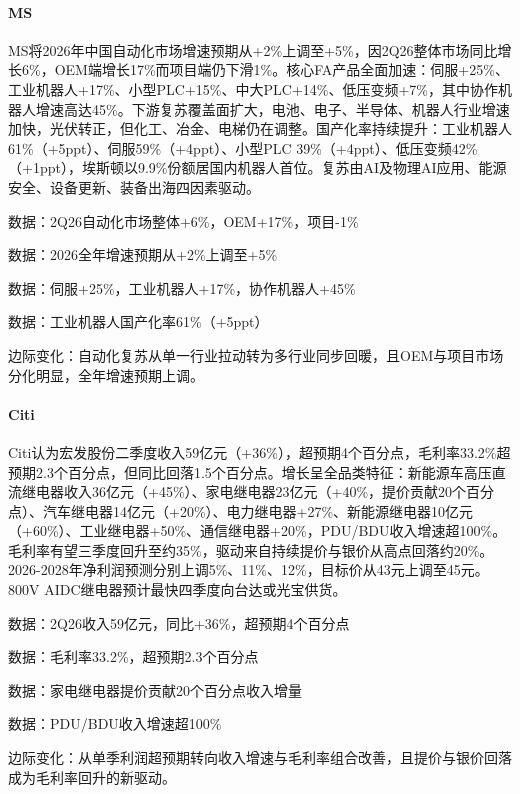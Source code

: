 \documentclass[11pt]{ctexart}
\begin{document}
\paragraph{MS} MS将2026年中国自动化市场增速预期从+2\%上调至+5\%，因2Q26整体市场同比增长6\%，OEM端增长17\%而项目端仍下滑1\%。核心FA产品全面加速：伺服+25\%、工业机器人+17\%、小型PLC+15\%、中大PLC+14\%、低压变频+7\%，其中协作机器人增速高达45\%。下游复苏覆盖面扩大，电池、电子、半导体、机器人行业增速加快，光伏转正，但化工、冶金、电梯仍在调整。国产化率持续提升：工业机器人61\%（+5ppt）、伺服59\%（+4ppt）、小型PLC 39\%（+4ppt）、低压变频42\%（+1ppt），埃斯顿以9.9\%份额居国内机器人首位。复苏由AI及物理AI应用、能源安全、设备更新、装备出海四因素驱动。
{\small\color{refgray}数据：2Q26自动化市场整体+6\%，OEM+17\%，项目-1\%\par}
{\small\color{refgray}数据：2026全年增速预期从+2\%上调至+5\%\par}
{\small\color{refgray}数据：伺服+25\%，工业机器人+17\%，协作机器人+45\%\par}
{\small\color{refgray}数据：工业机器人国产化率61\%（+5ppt）\par}
{\small\color{refgray}边际变化：自动化复苏从单一行业拉动转为多行业同步回暖，且OEM与项目市场分化明显，全年增速预期上调。\par}
\paragraph{Citi} Citi认为宏发股份二季度收入59亿元（+36\%），超预期4个百分点，毛利率33.2\%超预期2.3个百分点，但同比回落1.5个百分点。增长呈全品类特征：新能源车高压直流继电器收入36亿元（+45\%）、家电继电器23亿元（+40\%，提价贡献20个百分点）、汽车继电器14亿元（+20\%）、电力继电器+27\%、新能源继电器10亿元（+60\%）、工业继电器+50\%、通信继电器+20\%，PDU/BDU收入增速超100\%。毛利率有望三季度回升至约35\%，驱动来自持续提价与银价从高点回落约20\%。2026-2028年净利润预测分别上调5\%、11\%、12\%，目标价从43元上调至45元。800V AIDC继电器预计最快四季度向台达或光宝供货。
{\small\color{refgray}数据：2Q26收入59亿元，同比+36\%，超预期4个百分点\par}
{\small\color{refgray}数据：毛利率33.2\%，超预期2.3个百分点\par}
{\small\color{refgray}数据：家电继电器提价贡献20个百分点收入增量\par}
{\small\color{refgray}数据：PDU/BDU收入增速超100\%\par}
{\small\color{refgray}边际变化：从单季利润超预期转向收入增速与毛利率组合改善，且提价与银价回落成为毛利率回升的新驱动。\par}
\end{document}
